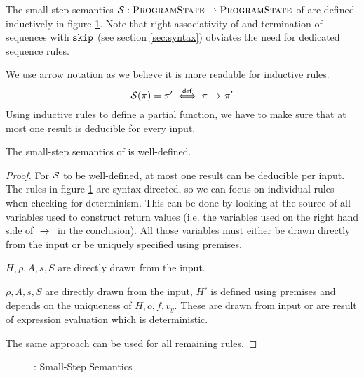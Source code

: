 The small-step semantics $\mathcal{S} : \textup{\textsc{ProgramState}} \rightharpoonup \textup{\textsc{ProgramState}}$ of \svlidf are defined inductively in figure \ref{fig:svl-sem-dyn-sstep}.
Note that right-associativity of \ttt{;} and termination of sequences with $\textup{\texttt{skip}}$ (see section \ref{sec:syntax}) obviates the need for dedicated sequence rules.

We use arrow notation as we believe it is more readable for inductive rules.
\begin{displaymath}
\mathcal{S}(\pi) = \pi' \overset{\textup{\textmd{\textsf{def}}}}{\iff} {\pi} \,\,{\rightarrow^{}}\,\, {\pi'}
\end{displaymath}
Using inductive rules to define a partial function, we have to make sure that at most one result is deducible for every input.
\begin{lemma}
    The small-step semantics of \svlidf is well-defined.
\end{lemma}
\begin{proof}
    For $\mathcal{S}$ to be well-defined, at most one result can be deducible per input.
    The rules in figure \ref{fig:svl-sem-dyn-sstep} are syntax directed, so we can focus on individual rules when checking for determinism.
    This can be done by looking at the source of all variables used to construct return values (i.e. the variables used on the right hand side of ${} \,\,{\rightarrow^{}}\,\, {}$ in the conclusion).
    All those variables must either be drawn directly from the input or be uniquely specified using premises.
    
    $H, \rho, A, s, S$ are directly drawn from the input.
    
    $\rho, A, s, S$ are directly drawn from the input, $H'$ is defined using premises and depends on the uniqueness of $H, o, f, v_y$.
    These are drawn from input or are result of expression evaluation which is deterministic.
    
    The same approach can be used for all remaining rules.
\end{proof}

\begin{figure}
    \boxed{\sstep{\pi}{\pi}}
    
    \caption{\svlidf: Small-Step Semantics}
    \label{fig:svl-sem-dyn-sstep}
\end{figure}


